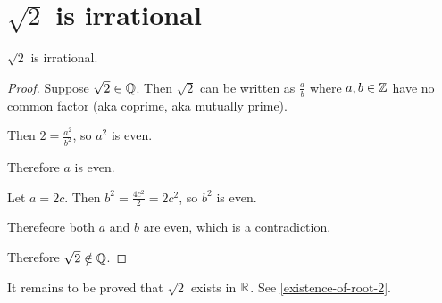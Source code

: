 \section{$\sqrt{2}$ is irrational}
\begin{theorem*}
  $\sqrt{2}$ is irrational.
\end{theorem*}

\begin{proof}
  Suppose $\sqrt{2} \in \mathbb{Q}$. Then $\sqrt{2}$ can be written as $\frac{a}{b}$ where $a, b \in \mathbb{Z}$
  have no common factor (aka coprime, aka mutually prime).

  Then $2 = \frac{a^2}{b^2}$, so $a^2$ is even.

  Therefore $a$ is even.

  Let $a = 2c$. Then $b^2 = \frac{4c^2}{2} = 2c^2$, so $b^2$ is even.

  Therefeore both $a$ and $b$ are even, which is a contradiction.

  Therefore $\sqrt{2} \notin \mathbb{Q}$.
\end{proof}

\begin{remark*}
  It remains to be proved that $\sqrt{2}$ exists in $\mathbb{R}$. See \ref{existence-of-root-2}.
\end{remark*}


